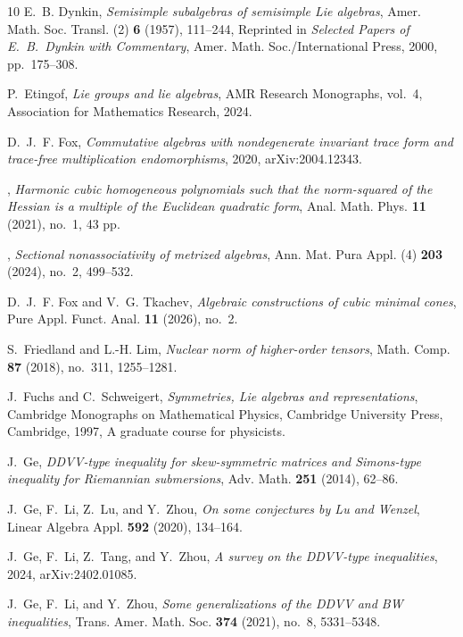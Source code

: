 \documentclass [leqno, 10pt]{amsart}
\theoremstyle{definition}
\numberwithin{equation}{section}
\begin{document}
\begin{thebibliography}{10}
E.~B. Dynkin, \emph{Semisimple subalgebras of semisimple {L}ie algebras}, Amer.
  Math. Soc. Transl. (2) \textbf{6} (1957), 111--244, Reprinted in
  \emph{Selected Papers of E.~B.~Dynkin with Commentary}, Amer. Math.
  Soc./International Press, 2000, pp.~175--308.

P.~Etingof, \emph{Lie groups and lie algebras}, AMR Research Monographs,
  vol.~4, Association for Mathematics Research, 2024.

D.~J.~F. Fox, \emph{Commutative algebras with nondegenerate invariant trace
  form and trace-free multiplication endomorphisms}, 2020, arXiv:2004.12343.

\bysame, \emph{Harmonic cubic homogeneous polynomials such that the
  norm-squared of the {H}essian is a multiple of the {E}uclidean quadratic
  form}, Anal. Math. Phys. \textbf{11} (2021), no.~1, 43 pp.

\bysame, \emph{Sectional nonassociativity of metrized algebras}, Ann. Mat. Pura
  Appl. (4) \textbf{203} (2024), no.~2, 499--532.

D.~J.~F. Fox and V.~G. Tkachev, \emph{Algebraic constructions of cubic minimal
  cones}, Pure Appl. Funct. Anal. \textbf{11} (2026), no.~2.

S.~Friedland and L.-H. Lim, \emph{Nuclear norm of higher-order tensors}, Math.
  Comp. \textbf{87} (2018), no.~311, 1255--1281.

J.~Fuchs and C.~Schweigert, \emph{Symmetries, {L}ie algebras and
  representations}, Cambridge Monographs on Mathematical Physics, Cambridge
  University Press, Cambridge, 1997, A graduate course for physicists.

J.~Ge, \emph{D{DVV}-type inequality for skew-symmetric matrices and
  {S}imons-type inequality for {R}iemannian submersions}, Adv. Math.
  \textbf{251} (2014), 62--86.

J.~Ge, F.~Li, Z.~Lu, and Y.~Zhou, \emph{On some conjectures by {L}u and
  {W}enzel}, Linear Algebra Appl. \textbf{592} (2020), 134--164.

J.~Ge, F.~Li, Z.~Tang, and Y.~Zhou, \emph{A survey on the {DDVV}-type
  inequalities}, 2024, arXiv:2402.01085.

J.~Ge, F.~Li, and Y.~Zhou, \emph{Some generalizations of the {DDVV} and {BW}
  inequalities}, Trans. Amer. Math. Soc. \textbf{374} (2021), no.~8,
  5331--5348.


\end{thebibliography}
\end{document}

